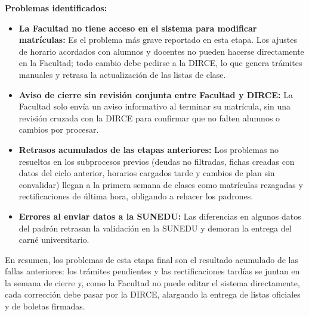 \textbf{Problemas identificados:}
\begin{itemize}
    \item \textbf{La Facultad no tiene acceso en el sistema para modificar matrículas:} Es el problema más grave reportado en esta etapa. Los ajustes de horario acordados con alumnos y docentes no pueden hacerse directamente en la Facultad; todo cambio debe pedirse a la DIRCE, lo que genera trámites manuales y retrasa la actualización de las listas de clase.
    \item \textbf{Aviso de cierre sin revisión conjunta entre Facultad y DIRCE:} La Facultad solo envía un aviso informativo al terminar su matrícula, sin una revisión cruzada con la DIRCE para confirmar que no falten alumnos o cambios por procesar.
    \item \textbf{Retrasos acumulados de las etapas anteriores:} Los problemas no resueltos en los subprocesos previos (deudas no filtradas, fichas creadas con datos del ciclo anterior, horarios cargados tarde y cambios de plan sin convalidar) llegan a la primera semana de clases como matrículas rezagadas y rectificaciones de última hora, obligando a rehacer los padrones.
    \item \textbf{Errores al enviar datos a la SUNEDU:} Las diferencias en algunos datos del padrón retrasan la validación en la SUNEDU y demoran la entrega del carné universitario.
\end{itemize}

En resumen, los problemas de esta etapa final son el resultado acumulado de las fallas anteriores: los trámites pendientes y las rectificaciones tardías se juntan en la semana de cierre y, como la Facultad no puede editar el sistema directamente, cada corrección debe pasar por la DIRCE, alargando la entrega de listas oficiales y de boletas firmadas.
